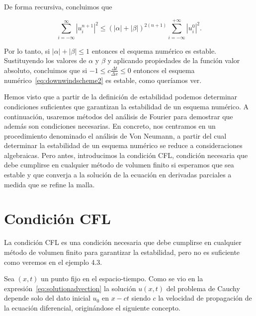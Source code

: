 \begin{example}
  De forma recursiva, concluimos que

  \begin{equation*}
    \sum_{i=-\infty}^{\infty}
    {\left|u^{n+1}_{i}\right|}^{2}\leq
    {
      \left(
      \left|\alpha\right|+
      \left|\beta\right|
      \right)
    }^{2\left(n+1\right)}
    \sum_{i=-\infty}^{+\infty}
    {\left|u^{0}_{i}\right|}^{2}.
  \end{equation*}

  Por lo tanto, si
  \begin{math}
    \left|\alpha\right|+
    \left|\beta\right|\leq
    1
  \end{math}
  entonces el esquema numérico es estable.
  Sustituyendo los valores de $\alpha$ y $\beta$ y aplicando
  propiedades de la función valor absoluto, concluimos que si
  \begin{math}
    -1\leq
    c\frac{\Delta t}{\Delta x}\leq
    0
  \end{math}
  entonces el esquema numérico~\eqref{eq:downwindscheme2} es estable, como queríamos ver.
\end{example}

Hemos visto que a partir de la definición de estabilidad podemos
determinar condiciones suficientes que garantizan la estabilidad de
un esquema numérico.
A continuación, usaremos métodos del análisis de Fourier para
demostrar que además son condiciones necesarias.
En concreto, nos centramos en un procedimiento denominado el análisis
de Von Neumann, a partir del cual determinar la estabilidad de un
esquema numérico se reduce a consideraciones algebraicas.
Pero antes, introducimos la condición CFL, condición necesaria que
debe cumplirse en cualquier método de volumen finito si esperamos que
sea estable y que converja a la solución de la ecuación en derivadas
parciales a medida que se refine la malla.

\section{Condición CFL}

La condición CFL es una condición necesaria que debe cumplirse en
cualquier método de volumen finito para garantizar la estabilidad,
pero no es suficiente como veremos en el ejemplo 4.3.

Sea $\left(x,t\right)$ un punto fijo en el espacio-tiempo.
Como se vio en la expresión~\eqref{eq:solutionadvection} la solución
$u\left(x,t\right)$ del problema de Cauchy depende solo del dato
inicial $u_{0}$ en $x-ct$ siendo $c$ la velocidad de propagación de
la ecuación diferencial, originándose el siguiente concepto.

